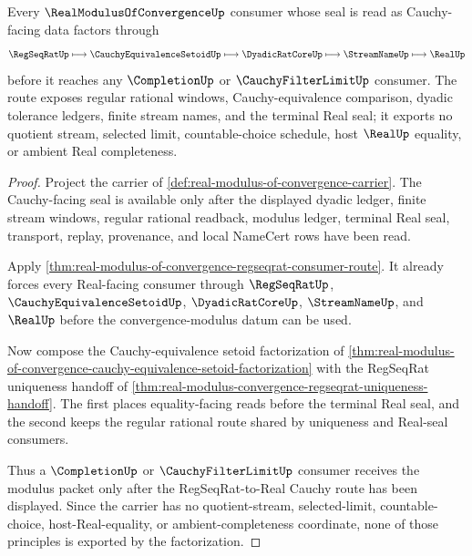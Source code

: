 \begin{theorem}
\label{thm:real-modulus-of-convergence-regseqrat-real-cauchy-factorization}
Every $\RealModulusOfConvergenceUp$ consumer whose seal is read as Cauchy-facing data factors through
$$
\RegSeqRatUp \longmapsto \CauchyEquivalenceSetoidUp \longmapsto \DyadicRatCoreUp \longmapsto \StreamNameUp \longmapsto \RealUp
$$
before it reaches any $\CompletionUp$ or $\CauchyFilterLimitUp$ consumer. The route exposes regular rational windows, Cauchy-equivalence comparison, dyadic tolerance ledgers, finite stream names, and the terminal Real seal; it exports no quotient stream, selected limit, countable-choice schedule, host $\RealUp$ equality, or ambient Real completeness.
\end{theorem}
\begin{proof}
Project the carrier of \autoref{def:real-modulus-of-convergence-carrier}. The Cauchy-facing seal is available only after the displayed dyadic ledger, finite stream windows, regular rational readback, modulus ledger, terminal Real seal, transport, replay, provenance, and local NameCert rows have been read.

Apply \autoref{thm:real-modulus-of-convergence-regseqrat-consumer-route}. It already forces every Real-facing consumer through $\RegSeqRatUp$, $\CauchyEquivalenceSetoidUp$, $\DyadicRatCoreUp$, $\StreamNameUp$, and $\RealUp$ before the convergence-modulus datum can be used.

Now compose the Cauchy-equivalence setoid factorization of \autoref{thm:real-modulus-of-convergence-cauchy-equivalence-setoid-factorization} with the RegSeqRat uniqueness handoff of \autoref{thm:real-modulus-convergence-regseqrat-uniqueness-handoff}. The first places equality-facing reads before the terminal Real seal, and the second keeps the regular rational route shared by uniqueness and Real-seal consumers.

Thus a $\CompletionUp$ or $\CauchyFilterLimitUp$ consumer receives the modulus packet only after the RegSeqRat-to-Real Cauchy route has been displayed. Since the carrier has no quotient-stream, selected-limit, countable-choice, host-Real-equality, or ambient-completeness coordinate, none of those principles is exported by the factorization.
\end{proof}
